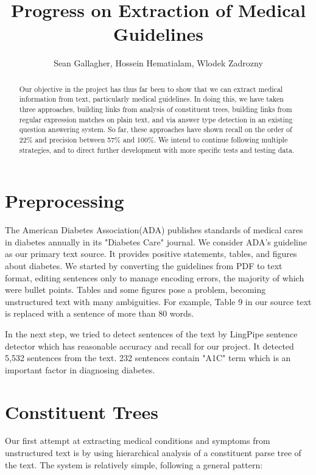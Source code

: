 \documentclass[12pt,letterpaper]{article}
\author{Sean Gallagher, Hossein Hematialam, Wlodek Zadrozny}
\title{Progress on Extraction of Medical Guidelines}
\begin{document}
\maketitle
\begin{abstract}
Our objective in the project has thus far been to show that we can extract medical information from text, particularly medical guidelines. In doing this, we have taken three approaches, building links from analysis of constituent trees, building links from regular expression matches on plain text, and via answer type detection in an existing question answering system. So far, these approaches have shown recall on the order of 22\% and precision between 57\% and 100\%. We intend to continue following multiple strategies, and to direct further development with more specific tests and testing data.
\end{abstract}

\section{Preprocessing}
The American Diabetes Association(ADA) publishes standards of medical cares in diabetes annually in its "Diabetes Care" journal. We consider ADA's guideline\cite{american2013diagnosis} as our primary text source. It provides positive statements, tables, and figures about diabetes. We started by converting the guidelines from PDF to text format, editing sentences only to manage encoding errors, the majority of which were bullet points. Tables and some figures pose a problem, becoming unstructured text with many ambiguities. For example, Table 9 in our source text is replaced with a sentence of more than 80 words.

In the next step, we tried to detect sentences of the text by LingPipe sentence detector which has reasonable accuracy and recall for our project. It detected 5,532 sentences from the text. 232 sentences contain "A1C" term which is an important factor in diagnosing diabetes.
   
\section{Constituent Trees}
Our first attempt at extracting medical conditions and symptoms from unstructured text is by using hierarchical analysis of a constituent parse tree of the text. The system is relatively simple, following a general pattern:
\end{document}
